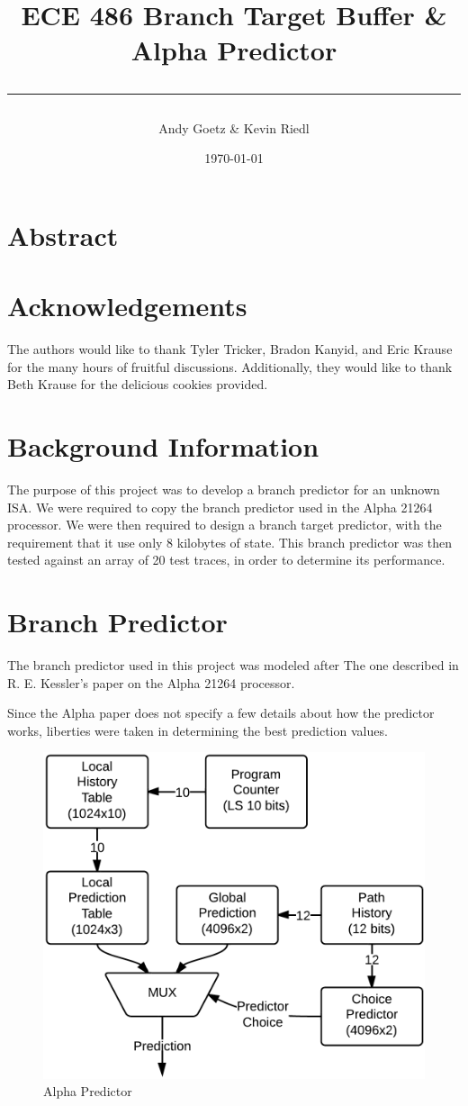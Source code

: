 \documentclass[twocolumn]{article}
\author{\LARGE Andy Goetz \& Kevin Riedl}
\date{\today}
\title{\Huge \textbf{ECE 486 Branch Target Buffer \& Alpha Predictor} \\ \rule{\linewidth}{0.5mm}}
\newcommand{\centerimage}[3]{
\begin{figure}[ht!]  
\begin{center}
#1
\caption{#2}
\label{#3}
\end{center}
\end{figure}}
\begin{document}
\maketitle
\section{Abstract}
\section{Acknowledgements}

The authors would like to thank Tyler Tricker, Bradon Kanyid, and Eric
Krause for the many hours of fruitful discussions. Additionally, they
would like to thank Beth Krause for the delicious cookies provided.

\section{Background Information}
The purpose of this project was to develop a branch predictor for an
unknown ISA. We were required to copy the branch predictor used in the
Alpha 21264 processor. We were then required to design a branch target
predictor, with the requirement that it use only 8 kilobytes of
state. This branch predictor was then tested against an array of 20
test traces, in order to determine its performance. 


\section{Branch Predictor}
The branch predictor used in this project was modeled after
The one described in R. E. Kessler's paper on the Alpha 
21264 processor. 

Since the Alpha paper does not specify a few details about how the predictor
works, liberties were taken in determining the best prediction values. 

\centerimage{\includegraphics[width=\columnwidth]{AlphaPredictor.png}}{Alpha Predictor}{Alpha}
\end{document}

